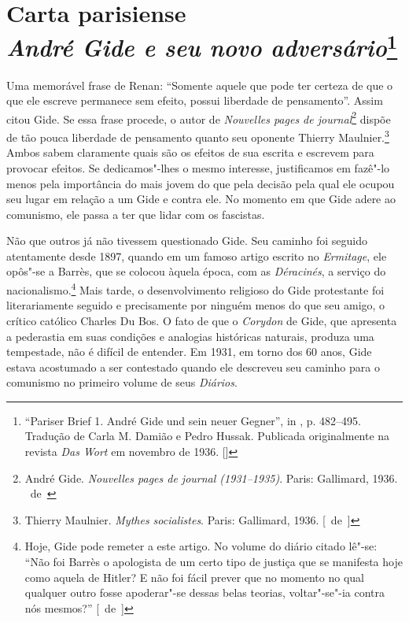 \chapter{Carta parisiense \\ \emph{André Gide e seu novo adversário}\footnote[*]{``Pariser Brief 1. André Gide und sein neuer Gegner'', in
  , p. 482--495. Tradução de Carla M. Damião e Pedro Hussak. Publicada originalmente na revista \emph{Das Wort} em novembro de 1936. []}}


Uma memorável frase de Renan: ``Somente aquele que pode ter certeza de
que o que ele escreve permanece sem efeito, possui liberdade de
pensamento''. Assim citou Gide. Se essa frase procede, o autor de
\emph{Nouvelles pages de journal}\footnote{André Gide.
  \emph{Nouvelles pages de journal (1931--1935)}. Paris: Gallimard, 1936. \versal{[N.}~de~\versal{W.B.]}}
dispõe de tão pouca liberdade de pensamento quanto seu oponente
Thierry Maulnier.\footnote{Thierry Maulnier. \emph{Mythes
  socialistes}. Paris: Gallimard, 1936. [~de~]} Ambos sabem claramente quais
são os efeitos de sua escrita e escrevem para provocar
efeitos. Se dedicamos"-lhes o mesmo interesse, justificamos em
fazê"-lo menos pela importância do mais jovem do que pela decisão pela
qual ele ocupou seu lugar em relação a um Gide e contra ele. No
momento em que Gide adere ao comunismo, ele passa a ter que lidar com
os fascistas.

Não que outros já não tivessem questionado Gide. Seu caminho foi seguido
atentamente desde 1897, quando em um famoso artigo escrito no
\emph{Ermitage}, ele opôs"-se a Barrès, que se colocou àquela época, com
as \emph{Déracinés}, a serviço do nacionalismo.\footnote{Hoje, Gide
  pode remeter a este artigo. No volume do diário citado lê"-se: ``Não
  foi Barrès o apologista de um certo tipo de justiça que se manifesta
  hoje como aquela de Hitler? E não foi fácil prever que no momento no
  qual qualquer outro fosse apoderar"-se dessas belas teorias,
  voltar"-se"-ia contra nós mesmos?'' [~de~]} Mais tarde, o desenvolvimento
religioso do Gide protestante foi literariamente seguido e
precisamente por ninguém menos do que seu amigo, o crítico católico
Charles Du Bos. O fato de que o \emph{Corydon} de Gide, que apresenta a pederastia
em suas condições e analogias históricas naturais, produza uma
tempestade, não é difícil de entender. Em 1931, em torno dos 60 anos,
Gide estava acostumado a ser contestado quando ele descreveu seu caminho
para o comunismo no primeiro volume de seus \emph{Diários}.

